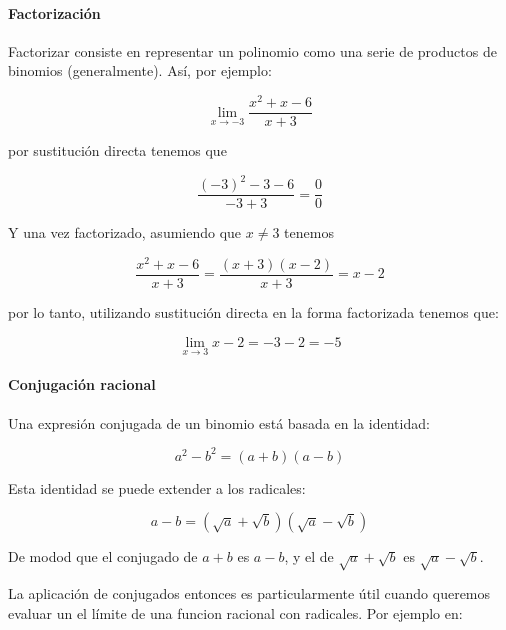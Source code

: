 \documentclass[
]{book}
\begin{document}
\hypertarget{factorizaciuxf3n}{%
\paragraph{Factorización}\label{factorizaciuxf3n}}

Factorizar consiste en representar un polinomio como una serie de productos de binomios (generalmente). Así, por ejemplo:

\begin{equation}
    \lim \limits_{x \rightarrow -3} \frac{x^2 + x -6}{x + 3}
\end{equation}

por sustitución directa tenemos que

\begin{equation}
\frac{(-3)^2 - 3 - 6}{-3 + 3} = \frac{0}{0}
\end{equation}

Y una vez factorizado, asumiendo que \(x \neq 3\) tenemos

\begin{equation}
 \frac{x^2 + x - 6}{x + 3} = \frac{(x + 3)(x - 2)}{x + 3} = x-2
 \end{equation}

por lo tanto, utilizando sustitución directa en la forma factorizada tenemos que:

\begin{equation}
 \lim\limits_{x \rightarrow 3} x - 2 = - 3 - 2 = -5
\end{equation}

\hypertarget{conjugaciuxf3n-racional}{%
\paragraph{Conjugación racional}\label{conjugaciuxf3n-racional}}

Una expresión conjugada de un binomio está basada en la identidad:

\[ a^2 - b^2 =(a + b)(a - b)\]

Esta identidad se puede extender a los radicales:

\[ a - b = (\sqrt{a} + \sqrt{b})(\sqrt{a} - \sqrt{b})\]

De modod que el conjugado de \(a + b\) es \(a-b\), y el de \(\sqrt{a} + \sqrt{b}\) es \(\sqrt{a} - \sqrt{b}\).

La aplicación de conjugados entonces es particularmente útil cuando queremos evaluar un el límite de una funcion racional con radicales. Por ejemplo en:
\end{document}
